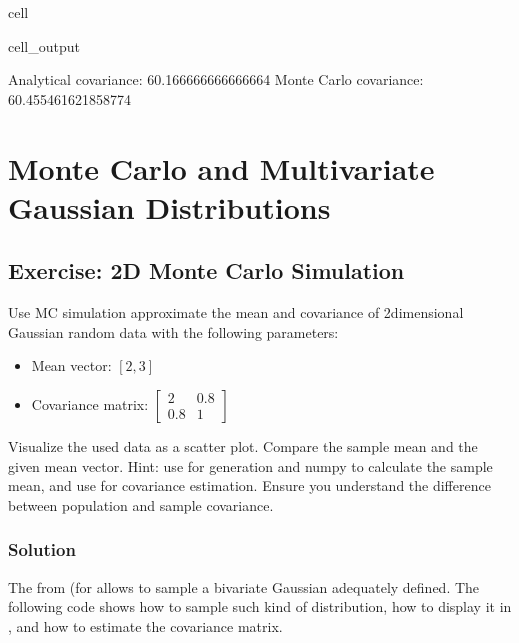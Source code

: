 \documentclass[letterpaper,10pt,english]{jupyterBook}
\begin{document}
\begin{sphinxuseclass}{cell}
\begin{sphinxVerbatimOutput}
\begin{sphinxuseclass}{cell_output}
\begin{sphinxVerbatim}[commandchars=\\\{\}]
Analytical covariance: 60.166666666666664
Monte Carlo covariance: 60.455461621858774
\end{sphinxVerbatim}

\end{sphinxuseclass}\end{sphinxVerbatimOutput}

\end{sphinxuseclass}

\section{Monte Carlo and Multivariate Gaussian Distributions}
\label{\detokenize{01:monte-carlo-and-multivariate-gaussian-distributions}}

\subsection{Exercise: 2D Monte Carlo Simulation}
\label{\detokenize{01:exercise-2d-monte-carlo-simulation}}
\sphinxAtStartPar
Use MC simulation approximate the mean and covariance of 2\sphinxhyphen{}dimensional Gaussian random data with the following parameters:
\begin{itemize}
\item {} 
\sphinxAtStartPar
Mean vector: \([2, 3]\)

\item {} 
\sphinxAtStartPar
Covariance matrix: \(\begin{bmatrix}2&0.8\\0.8&1\end{bmatrix}\)

\end{itemize}

\sphinxAtStartPar
Visualize the used data as a scatter plot. Compare the sample mean and the given mean vector.
Hint: use  for generation and numpy to calculate the sample mean, and use  for covariance estimation.
Ensure you understand the difference between population and sample covariance.


\subsubsection{Solution}
\label{\detokenize{01:id9}}
\sphinxAtStartPar
The  from  (for  allows to sample a bivariate Gaussian adequately defined. The following code shows how to sample such kind of distribution, how to display it in , and how to estimate the covariance matrix.
\end{document}
